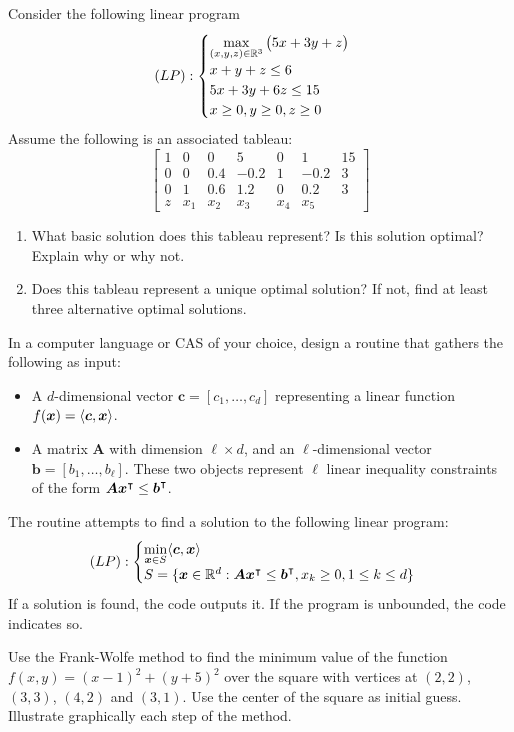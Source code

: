 \begin{problem}[Intermediate]
Consider the following linear program
\begin{equation*}
(LP): \begin{cases}
\displaystyle{\max_{(x,y,z) \in \mathbb{R}^3} \big( 5x+3y+z \big)} \\
x+y+z \leq 6 \\
5x+3y+6z \leq 15 \\
x \geq 0, y \geq 0, z \geq 0
\end{cases}
\end{equation*}
Assume the following is an associated tableau:
\begin{equation*}
\begin{bmatrix}
1 &   0 &   0 &    5 &   0 &   1  & 15 \\
0 &   0 & 0.4 & -0.2 &   1 & -0.2 &  3 \\
0 &   1 & 0.6 &  1.2 &   0 &  0.2 &  3 \\ \hline
z & x_1 & x_2 &  x_3 & x_4 &  x_5  
\end{bmatrix}
\end{equation*}
\begin{enumerate}
\item What basic solution does this tableau represent? Is this solution optimal? Explain why or why not.
\item Does this tableau represent a unique optimal solution? If not, find at least three alternative optimal solutions.
\end{enumerate}
\end{problem}

\begin{problem}[CAS]
In a computer language or CAS of your choice, design a routine that gathers the following as input:
\begin{itemize}
	\item A $d$-dimensional vector $\boldsymbol{c}=[c_1, \dotsc, c_d]$ representing a linear function $f(\boldsymbol{x}) = \langle \boldsymbol{c}, \boldsymbol{x} \rangle$.
	\item A matrix $\boldsymbol{A}$ with dimension $\ell \times d$, and an $\ell$-dimensional vector $\boldsymbol{b} = [b_1, \dotsc, b_\ell]$.  These two objects represent $\ell$ linear inequality constraints of the form $\boldsymbol{A}{\boldsymbol{x}}^\intercal \leq {\boldsymbol{b}}^\intercal$. 
\end{itemize}
The routine attempts to find a solution to the following linear program:
\begin{equation*}  
(LP): \begin{cases} \displaystyle{\min_{\boldsymbol{x}\in S} \langle \boldsymbol{c}, \boldsymbol{x}\rangle} \\ S = \{ \boldsymbol{x} \in \mathbb{R}^d : \boldsymbol{A}{\boldsymbol{x}}^\intercal \leq {\boldsymbol{b}}^\intercal, x_k \geq 0, 1 \leq k \leq d \} \end{cases}
\end{equation*}
If a solution is found, the code outputs it.  If the program is unbounded, the code indicates so.  
\end{problem}

\begin{problem}[Basic]
Use the Frank-Wolfe method to find the minimum value of the function $f(x,y)=(x-1)^2+(y+5)^2$ over the square with vertices at $(2,2)$, $(3,3)$, $(4,2)$ and $(3,1)$. Use the center of the square as initial guess.  Illustrate graphically each step of the method.
\end{problem}
